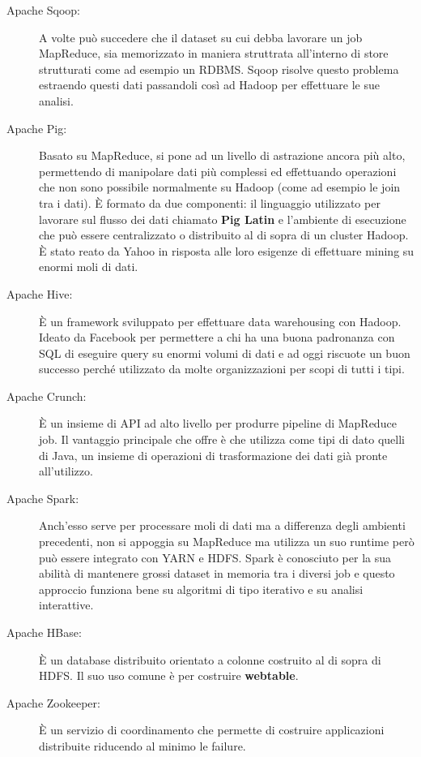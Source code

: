 \begin{description}
  \item[Apache Sqoop:] A volte può succedere che il dataset su cui debba lavorare un job MapReduce, sia memorizzato in maniera struttrata all'interno di store strutturati come ad esempio un RDBMS. Sqoop risolve questo problema estraendo questi dati passandoli così ad Hadoop per effettuare le sue analisi.
  \item[Apache Pig:] Basato su MapReduce, si pone ad un livello di astrazione ancora più alto, permettendo di manipolare dati più complessi ed effettuando operazioni che non sono possibile normalmente su Hadoop (come ad esempio le join tra i dati). È formato da due componenti: il linguaggio utilizzato per lavorare sul flusso dei dati chiamato \textbf{Pig Latin} e l'ambiente di esecuzione che può essere centralizzato o distribuito al di sopra di un cluster Hadoop. È stato reato da Yahoo in risposta alle loro esigenze di effettuare mining su enormi moli di dati. 
  \item[Apache Hive:] È un framework sviluppato per effettuare data warehousing con Hadoop. Ideato da Facebook per permettere a chi ha una buona padronanza con SQL di eseguire query su enormi volumi di dati e ad oggi riscuote un buon successo perché utilizzato da molte organizzazioni per scopi di tutti i tipi.
  \item[Apache Crunch:] È un insieme di API ad alto livello per produrre pipeline di MapReduce job. Il vantaggio principale che offre è che utilizza come tipi di dato quelli di Java, un insieme di operazioni di trasformazione dei dati già pronte all'utilizzo.
  \item[Apache Spark:] Anch'esso serve per processare moli di dati ma a differenza degli ambienti precedenti, non si appoggia su MapReduce ma utilizza un suo runtime  però può essere integrato con YARN e HDFS. Spark è conosciuto per la sua abilità di mantenere grossi dataset in memoria tra i diversi job e questo approccio funziona bene su algoritmi di tipo iterativo e su analisi interattive.
  \item[Apache HBase:] È un database distribuito orientato a colonne costruito al di sopra di HDFS. Il suo uso comune è per costruire \textbf{webtable}.
  \item[Apache Zookeeper:] È un servizio di coordinamento che permette di costruire applicazioni distribuite riducendo al minimo le failure.
\end{description}
